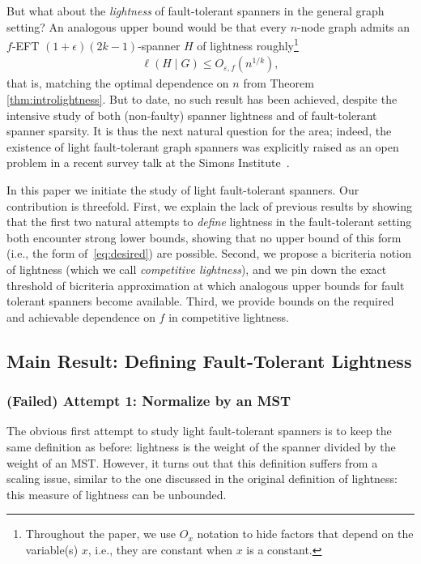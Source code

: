\documentclass{article}
\theoremstyle{plain}
\theoremstyle{definition}
\newcommand{\eps}{\varepsilon}
\begin{document}
But what about the \emph{lightness} of fault-tolerant spanners in the general graph setting?
An analogous upper bound would be that every $n$-node graph admits an $f$-EFT $(1+\epsilon)(2k-1)$-spanner $H$ of lightness roughly\footnote{Throughout the paper, we use $O_x$ notation to hide factors that depend on the variable(s) $x$, i.e., they are constant when $x$ is a constant.}
\begin{align} \label{eq:desired}
    \ell(H \mid G) \le O_{\eps, f}\left(n^{1/k}\right),
\end{align}
that is, matching the optimal dependence on $n$ from Theorem \ref{thm:introlightness}.
But to date, no such result has been achieved, despite the intensive study of both (non-faulty) spanner lightness and of fault-tolerant spanner sparsity. 
It is thus the next natural question for the area; indeed, the existence of light fault-tolerant graph spanners was explicitly raised as an open problem in a recent survey talk at the Simons Institute~\cite{HungLeTalk}.

In this paper we initiate the study of light fault-tolerant spanners.  
Our contribution is threefold.
First, we explain the lack of previous results by showing that the first two natural attempts to \emph{define} lightness in the fault-tolerant setting both encounter strong lower bounds, showing that no upper bound of this form (i.e., the form of~\eqref{eq:desired}) are possible.
Second, we propose a bicriteria notion of lightness (which we call \emph{competitive lightness}), and we pin down the exact threshold of bicriteria approximation at which analogous upper bounds for fault tolerant spanners become available.  Third, we provide bounds on the required and achievable dependence on $f$ in competitive lightness.

\subsection{Main Result: Defining Fault-Tolerant Lightness}

\subsubsection{(Failed) Attempt 1: Normalize by an MST}
The obvious first attempt to study light fault-tolerant spanners is to keep the same definition as before: lightness is the weight of the spanner divided by the weight of an MST.
However, it turns out that this definition suffers from a scaling issue, similar to the one discussed in the original definition of lightness: this measure of lightness can be unbounded.
\end{document}

